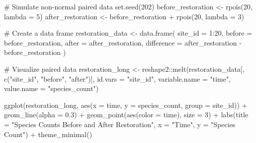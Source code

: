 \documentclass[
  letterpaper,
]{book}
\newenvironment{Shaded}{\begin{snugshade}}{\end{snugshade}}
\newcommand{\AttributeTok}[1]{\textcolor[rgb]{0.40,0.45,0.13}{#1}}
\newcommand{\CommentTok}[1]{\textcolor[rgb]{0.37,0.37,0.37}{#1}}
\newcommand{\DecValTok}[1]{\textcolor[rgb]{0.68,0.00,0.00}{#1}}
\newcommand{\FloatTok}[1]{\textcolor[rgb]{0.68,0.00,0.00}{#1}}
\newcommand{\FunctionTok}[1]{\textcolor[rgb]{0.28,0.35,0.67}{#1}}
\newcommand{\NormalTok}[1]{\textcolor[rgb]{0.00,0.23,0.31}{#1}}
\newcommand{\OtherTok}[1]{\textcolor[rgb]{0.00,0.23,0.31}{#1}}
\newcommand{\SpecialCharTok}[1]{\textcolor[rgb]{0.37,0.37,0.37}{#1}}
\newcommand{\StringTok}[1]{\textcolor[rgb]{0.13,0.47,0.30}{#1}}
\begin{document}
\begin{Shaded}
\begin{Highlighting}[]
\CommentTok{\# Simulate non{-}normal paired data}
\FunctionTok{set.seed}\NormalTok{(}\DecValTok{202}\NormalTok{)}
\NormalTok{before\_restoration }\OtherTok{\textless{}{-}} \FunctionTok{rpois}\NormalTok{(}\DecValTok{20}\NormalTok{, }\AttributeTok{lambda =} \DecValTok{5}\NormalTok{)}
\NormalTok{after\_restoration }\OtherTok{\textless{}{-}}\NormalTok{ before\_restoration }\SpecialCharTok{+} \FunctionTok{rpois}\NormalTok{(}\DecValTok{20}\NormalTok{, }\AttributeTok{lambda =} \DecValTok{3}\NormalTok{)}

\CommentTok{\# Create a data frame}
\NormalTok{restoration\_data }\OtherTok{\textless{}{-}} \FunctionTok{data.frame}\NormalTok{(}
  \AttributeTok{site\_id =} \DecValTok{1}\SpecialCharTok{:}\DecValTok{20}\NormalTok{,}
  \AttributeTok{before =}\NormalTok{ before\_restoration,}
  \AttributeTok{after =}\NormalTok{ after\_restoration,}
  \AttributeTok{difference =}\NormalTok{ after\_restoration }\SpecialCharTok{{-}}\NormalTok{ before\_restoration}
\NormalTok{)}

\CommentTok{\# Visualize paired data}
\NormalTok{restoration\_long }\OtherTok{\textless{}{-}}\NormalTok{ reshape2}\SpecialCharTok{::}\FunctionTok{melt}\NormalTok{(restoration\_data[, }\FunctionTok{c}\NormalTok{(}\StringTok{"site\_id"}\NormalTok{, }\StringTok{"before"}\NormalTok{, }\StringTok{"after"}\NormalTok{)], }
                                  \AttributeTok{id.vars =} \StringTok{"site\_id"}\NormalTok{, }
                                  \AttributeTok{variable.name =} \StringTok{"time"}\NormalTok{, }
                                  \AttributeTok{value.name =} \StringTok{"species\_count"}\NormalTok{)}

\FunctionTok{ggplot}\NormalTok{(restoration\_long, }\FunctionTok{aes}\NormalTok{(}\AttributeTok{x =}\NormalTok{ time, }\AttributeTok{y =}\NormalTok{ species\_count, }\AttributeTok{group =}\NormalTok{ site\_id)) }\SpecialCharTok{+}
  \FunctionTok{geom\_line}\NormalTok{(}\AttributeTok{alpha =} \FloatTok{0.3}\NormalTok{) }\SpecialCharTok{+}
  \FunctionTok{geom\_point}\NormalTok{(}\FunctionTok{aes}\NormalTok{(}\AttributeTok{color =}\NormalTok{ time), }\AttributeTok{size =} \DecValTok{3}\NormalTok{) }\SpecialCharTok{+}
  \FunctionTok{labs}\NormalTok{(}\AttributeTok{title =} \StringTok{"Species Counts Before and After Restoration"}\NormalTok{,}
       \AttributeTok{x =} \StringTok{"Time"}\NormalTok{,}
       \AttributeTok{y =} \StringTok{"Species Count"}\NormalTok{) }\SpecialCharTok{+}
  \FunctionTok{theme\_minimal}\NormalTok{()}
\end{Highlighting}
\end{Shaded}
\end{document}

